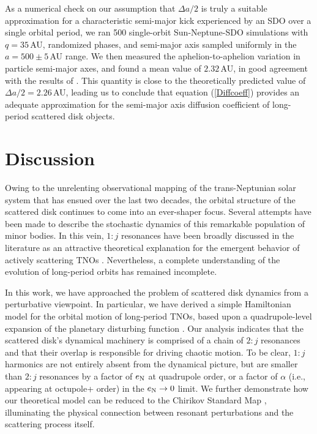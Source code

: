 \documentclass[twocolumn]{aastex62}
\newcommand{\en}{e_{\rm{N}}}
\begin{document}
As a numerical check on our assumption that $\Delta a/2$ is truly a suitable approximation for a characteristic semi-major kick experienced by an SDO over a single orbital period, we ran 500 single-orbit Sun-Neptune-SDO simulations with $q=35\,$AU, randomized phases, and semi-major axis sampled uniformly in the $a=500\pm5\,$AU range. We then measured the aphelion-to-aphelion variation in particle semi-major axes, and found a mean value of $2.32\,$AU, in good agreement with the results of \citet{2013Icar..222...20F}. This quantity is close to the theoretically predicted value of $\Delta a/2 = 2.26\,$AU, leading us to conclude that equation (\ref{Diffcoeff}) provides an adequate approximation for the semi-major axis diffusion coefficient of long-period scattered disk objects.


\section{Discussion} \label{sec:discuss}

Owing to the unrelenting observational mapping of the trans-Neptunian solar system that has ensued over the last two decades, the orbital structure of the scattered disk continues to come into an ever-shaper focus. Several attempts have been made to describe the stochastic dynamics of this remarkable population of minor bodies. In this vein, $1:j$ resonances have been broadly discussed in the literature as an attractive theoretical explanation for the emergent behavior of actively scattering TNOs \citep{2004AJ....128.1418P, 2018AJ....155..260V, 2019CeMDA.131...39L}. Nevertheless, a complete understanding of the evolution of long-period orbits has remained incomplete.

In this work, we have approached the problem of scattered disk dynamics from a perturbative viewpoint. In particular, we have derived a simple Hamiltonian model for the orbital motion of long-period TNOs, based upon a quadrupole-level expansion of the planetary disturbing function \citep{1962AJ.....67..300K,Laskar2010DISTFUNCT,2013MNRAS.435.2187M}. Our analysis indicates that the scattered disk's dynamical machinery is comprised of a chain of $2:j$ resonances and that their overlap is responsible for driving chaotic motion. To be clear, $1:j$ harmonics are not entirely absent from the dynamical picture, but are smaller than $2:j$ resonances by a factor of $\en$ at quadrupole order, or a factor of $\alpha$ (i.e., appearing at octupole+ order) in the $\en\rightarrow0$ limit. We further demonstrate how our theoretical model can be reduced to the Chirikov Standard Map \citep{Chirikov1979}, illuminating the physical connection between resonant perturbations and the scattering process itself.
\end{document}
